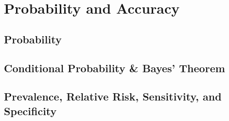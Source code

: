 

 \chapter{Probability and Accuracy } \section{Probability}
 \section{Conditional Probability \& Bayes’ Theorem}
 \section{Prevalence, Relative Risk, Sensitivity, and Specificity}
